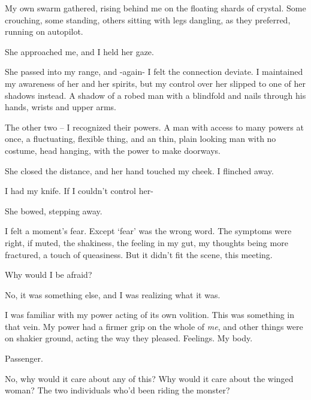 My own swarm gathered, rising behind me on the floating shards of crystal.  Some crouching, some standing, others sitting with legs dangling, as they preferred, running on autopilot.



She approached me, and I held her gaze.



She passed into my range, and -again- I felt the connection deviate.  I maintained my awareness of her and her spirits, but my control over her slipped to one of her shadows instead.  A shadow of a robed man with a blindfold and nails through his hands, wrists and upper arms.



The other two – I recognized their powers.  A man with access to many powers at once, a fluctuating, flexible thing, and an thin, plain looking man with no costume, head hanging, with the power to make doorways.



She closed the distance, and her hand touched my cheek.  I flinched away.



I had my knife.  If I couldn't control her-



She bowed, stepping away.



I felt a moment's fear.  Except `fear' was the wrong word.  The symptoms were right, if muted, the shakiness, the feeling in my gut, my thoughts being more fractured, a touch of queasiness.  But it didn't fit the scene, this meeting.



Why would I be afraid?



No, it was something else, and I was realizing what it was.



I was familiar with my power acting of its own volition.  This was something in that vein.  My power had a firmer grip on the whole of \emph{me}, and other things were on shakier ground, acting the way they pleased.  Feelings.  My body.



Passenger.



No, why would it care about any of this?  Why would it care about the winged woman?  The two individuals who'd been riding the monster?



